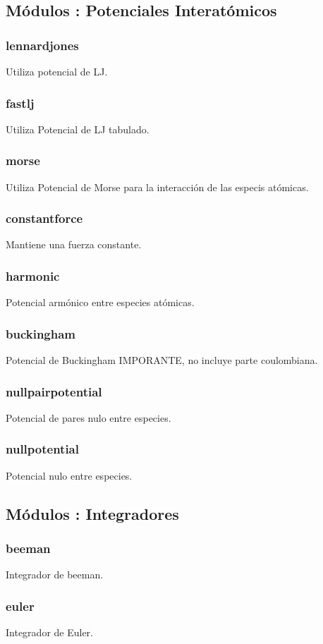 \documentclass[a4paper,10pt]{scrbook}
\begin{document}
\subsection{M\'odulos : Potenciales Interat\'omicos}
\subsubsection{lennardjones}
Utiliza potencial de LJ.
\subsubsection{fastlj}
Utiliza Potencial de LJ tabulado.
\subsubsection{morse}
Utiliza Potencial de Morse para la interacci\'on de las especis at\'omicas.
\subsubsection{constantforce}
Mantiene una fuerza constante.
\subsubsection{harmonic}
Potencial arm\'onico entre especies at\'omicas.
\subsubsection{buckingham}
Potencial de Buckingham IMPORANTE, no incluye parte coulombiana.
\subsubsection{nullpairpotential}
Potencial de pares nulo entre especies.
\subsubsection{nullpotential}
Potencial nulo entre especies.

\subsection{M\'odulos : Integradores}
\subsubsection{beeman}
Integrador de beeman.
\subsubsection{euler}
Integrador de Euler.
\end{document}
